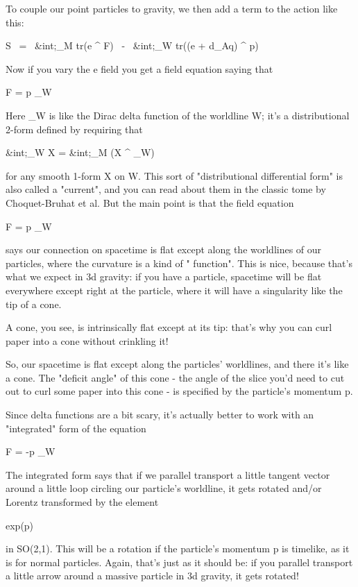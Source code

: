 To couple our point particles to gravity, we then add a term to 
the action like this:

S \  = \  &int;_{M}  tr(e ^ F) \  - \  
&int;_{W}  tr((e + d_{A}q) ^ p)

Now if you vary the e field you get a field equation saying that 

F = p \delta _{W}

Here \delta _{W} is like the Dirac delta function 
of the worldline W;
it's a distributional 2-form defined by requiring that

&int;_{W}  X   =  &int;_{M}  (X ^ \delta _{W}) 

for any smooth 1-form X on W.  This sort of "distributional
differential form" is also called a "current", and you
can read about them in the classic tome by Choquet-Bruhat et al.  But
the main point is that the field equation

F = p \delta _{W}

says our connection on spacetime is flat except along the worldlines
of our particles, where the curvature is a kind of "\delta 
function".  This is nice, because that's what we expect in 3d
gravity: if you have a particle, spacetime will be flat everywhere
except right at the particle, where it will have a singularity like
the tip of a cone.

A cone, you see, is intrinsically flat except at its tip: that's why 
you can curl paper into a cone without crinkling it!

So, our spacetime is flat except along the particles' worldlines, and
there it's like a cone.  The "deficit angle" of this cone -
the angle of the slice you'd need to cut out to curl some paper into
this cone - is specified by the particle's momentum p.

Since delta functions are a bit scary, it's actually better to work with 
an "integrated" form of the equation

F = -p \delta _{W}

The integrated form says that if we parallel transport a little tangent
vector around a little loop circling our particle's worldline, it gets
rotated and/or Lorentz transformed by the element

exp(p) 

in SO(2,1).  This will be a rotation if the particle's momentum p is 
timelike, as it is for normal particles.   Again, that's just as it 
should be: if you parallel transport a little arrow around a massive 
particle in 3d gravity, it gets rotated!

